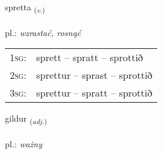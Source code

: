 \documentclass[frontgrid, backgrid]{flacards}\usepackage[]{graphicx}\usepackage[]{xcolor}
\begin{document}
\renewcommand{\flhead}{\vskip5pt \fboxsep=0pt {\small\bfseries\footnotesize Sagnorð | czasownik}}
\renewcommand{\fcfoot}{\vskip5pt \fboxsep=0pt \hspace{2pt}{\small\bfseries\footnotesize 3K}}

\renewcommand{\blhead}{\vskip5pt {\small\bfseries\footnotesize Sagnorð | czasownik }}
\renewcommand{\bcfoot}{\vskip5pt \hspace{2pt}{\small\bfseries\footnotesize 3K}}


{spretta \small{\textsubscript{(\textit{v.})}} \\[1ex] %
\textphonetic{[sprɛhta]} \\
pl.: \emph{wzrastać, rosnąć} \\  [2ex]
\renewcommand*{\arraystretch}{0.8}
\begin{tabular}{p{1cm}l}
\textsc{1sg}: & sprett -- spratt -- sprottið \\ 
\textsc{2sg}: & sprettur -- sprast -- sprottið \\ 
\textsc{3sg}: & sprettur -- spratt -- sprottið \\ 
\end{tabular}
}

\renewcommand{\flhead}{\vskip5pt \fboxsep=0pt {\small\bfseries\footnotesize Lýsingarorð | przymiotnik}}
\renewcommand{\fcfoot}{\vskip5pt \fboxsep=0pt \hspace{2pt}{\small\bfseries\footnotesize 3K}}

\renewcommand{\blhead}{\vskip5pt {\small\bfseries\footnotesize Lýsingarorð | przymiotnik }}
\renewcommand{\bcfoot}{\vskip5pt \hspace{2pt}{\small\bfseries\footnotesize 3K}}


{gildur \small{\textsubscript{(\textit{adj.})}} \\[1ex] %
\textphonetic{[cɪltʏr]} \\
pl.: \emph{ważny} \\  [2ex]
\renewcommand*{\arraystretch}{0.8}
}
\end{document}
